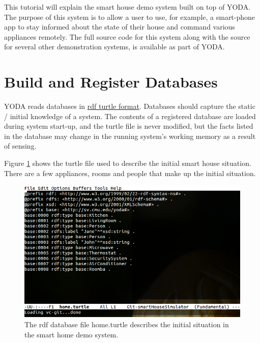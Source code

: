 \documentclass[titlepage]{article}
\begin{document}
This tutorial will explain the smart house demo system built on top of YODA.
The purpose of this system is to allow a user to use, for example, a smart-phone app to stay informed about the state of their house and command various appliances remotely.
The full source code for this system along with the source for several other demonstration systems, is available as part of YODA.

\section{Build and Register Databases}
YODA reads databases in \href{http://www.w3.org/TeamSubmission/turtle/}{rdf turtle format}.
Databases should capture the static / initial knowledge of a system.
The contents of a registered database are loaded during system start-up, and the turtle file is never modified, but the facts listed in the database may change in the running system's working memory as a result of sensing.

Figure \ref{fig:smart_house_database} shows the turtle file used to describe the initial smart house situation.
There are a few appliances, rooms and people that make up the initial situation.

\begin{figure}[h!]
\centering
\includegraphics[width=.75\textwidth]{SmartHouseDatabase}
\caption{The rdf database file home.turtle describes the initial situation in the smart home demo system.}
\label{fig:smart_house_database}
\end{figure}
\end{document}
